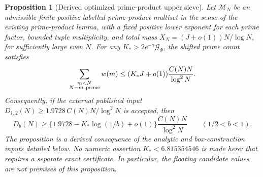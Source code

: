 \documentclass[11pt]{article}
\newtheorem{proposition}[theorem]{Proposition}
\begin{document}
\begin{proposition}[Derived optimized prime-product upper sieve]
\label{prop:g1-optimized-transfer}
Let $\mathcal M_N$ be an admissible finite positive labelled
prime-product multiset in the sense of the existing prime-product
lemma, with a fixed positive lower exponent for each prime factor,
bounded tuple multiplicity, and total mass
$X_N=(J+o(1))N/\log N$, for sufficiently large even $N$. For any
$K_*>2e^{-\gamma}\mathcal G_\Phi$, the shifted prime count satisfies
\[
 \sum_{\substack{m<N\\N-m\ {\rm prime}}}w(m)
       \le (K_*J+o(1))\frac{C(N)N}{\log^2N}.
\]
Consequently, if the external published input
$D_{1,2}(N)\ge1.9728\,C(N)N/\log^2N$ is accepted, then
\[
 D_b(N)\ge\{1.9728-K_*\log(1/b)+o(1)\}
                         \frac{C(N)N}{\log^2N}
 \qquad(1/2<b<1).
\]
The proposition is a derived consequence of the analytic and
box-construction inputs detailed below. No numeric assertion
$K_*<6.815354546$ is made here: that requires a separate exact
certificate. In particular, the floating candidate values are
not premises of this proposition.
\end{proposition}
\end{document}
